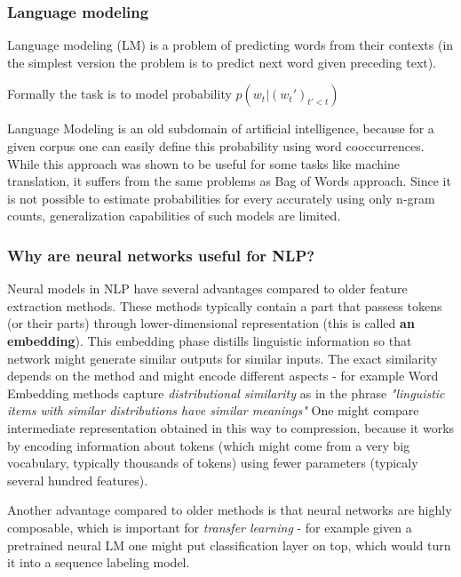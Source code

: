 \documentclass[11pt]{report}
\begin{document}
\subsubsection{Language modeling}


Language modeling (LM) is a problem of predicting words from their contexts (in the simplest version the problem is to predict next word given preceding text).

Formally the task is to model probability \(p(w_t | (w_t')_{t' < t})\)

Language Modeling is an old subdomain of artificial intelligence, because for a given corpus one can easily define this probability using word cooccurrences.
While this approach was shown to be useful for some tasks like machine translation, it suffers from the same problems as Bag of Words approach. Since it is not possible to estimate probabilities for every accurately
using only n-gram counts, generalization capabilities of such models are limited.

\subsubsection{Why are neural networks useful for NLP?}


Neural models in NLP have several advantages compared to older feature extraction methods.
These methods typically contain a part that passess tokens (or their parts) through lower-dimensional representation (this is called \textbf{an embedding}).
This embedding phase distills linguistic information so that network might generate similar outputs for similar inputs.
The exact similarity depends on the method and might encode different aspects - for example Word Embedding methods capture \emph{distributional similarity} as in the phrase \emph{"linguistic items with similar distributions have similar meanings"}
One might compare intermediate representation obtained in this way to compression, because it works by encoding information about tokens (which might come from a very big vocabulary, typically thousands of tokens)
using fewer parameters (typicaly several hundred features).

Another advantage compared to older methods is that neural networks are highly composable,
which is important for \emph{transfer learning} - for example given a pretrained neural LM one might put classification layer on top,
which would turn it into a sequence labeling model.
\end{document}
